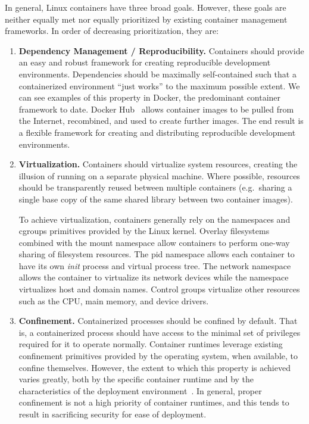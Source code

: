 In general, Linux containers have three broad goals. However, these goals are neither
equally met nor equally prioritized by existing container management frameworks. In order
of decreasing prioritization, they are:
\begin{enumerate}[font=\bfseries]
  \item \textbf{Dependency Management / Reproducibility.}
    Containers should provide an easy and robust framework for creating reproducible
    development environments. Dependencies should be maximally self-contained such that
    a containerized environment \enquote{just works} to the maximum possible extent. We
    can see examples of this property in Docker, the predominant container framework to
    date. Docker Hub~\cite{docker_hub} allows container images to be pulled from the
    Internet, recombined, and used to create further images. The end result is a flexible
    framework for creating and distributing reproducible development environments.

  \item \textbf{Virtualization.}
    Containers should virtualize system resources, creating the illusion of running on
    a separate physical machine. Where possible, resources should be transparently reused
    between multiple containers (e.g.~sharing a single base copy of the same shared
    library between two container images).

    To achieve virtualization, containers generally rely on the namespaces and cgroups
    primitives provided by the Linux kernel.  Overlay filesystems~\cite{overlayfs}
    combined with the mount namespace allow containers to perform one-way sharing of
    filesystem resources. The \gls{pid} namespace allows each container to have its own
    \textit{init} process and virtual process tree.  The network namespace allows the
    container to virtualize its network devices while the  namespace virtualizes host
    and domain names. Control groups virtualize other resources such as the CPU,
    main memory, and device drivers.

  \item \textbf{Confinement.}
    Containerized processes should be confined by default. That is, a containerized
    process should have access to the minimal set of privileges required for it to operate
    normally. Container runtimes leverage existing confinement primitives provided by the
    operating system, when available, to confine themselves. However, the extent to which
    this property is achieved varies greatly, both by the specific container runtime and
    by the characteristics of the deployment
    environment~\cite{sultan2019_container_security, lin2018_container_security,
    bui2015_docker_analysis}. In general, proper confinement is not a high priority of
    container runtimes, and this tends to result in sacrificing security for ease of
    deployment.
\end{enumerate}

